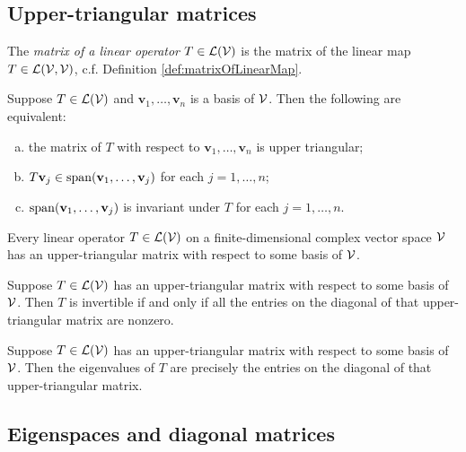 \subsection{Upper-triangular matrices}

\begin{defn}
  The \emph{matrix of a linear operator} $T\in {\cal L}({\cal V})$
  is the matrix of the linear map $T\in {\cal L}({\cal V}, {\cal V})$,
  c.f. Definition \ref{def:matrixOfLinearMap}.
\end{defn}

\begin{thm}
  \label{thm:upperTriangAndInvariantSubspaces}
  Suppose $T\in {\cal L}({\cal V})$
  and $\mathbf{v}_1, \ldots, \mathbf{v}_n$
  is a basis of ${\cal V}$.
  Then the following are equivalent:
  \begin{enumerate}[(a)]\itemsep0em
  \item the matrix of $T$ with respect to
    $\mathbf{v}_1, \ldots, \mathbf{v}_n$
    is upper triangular;
  \item $T\mathbf{v}_j\in \mathrm{span}(\mathbf{v}_1, \ldots, \mathbf{v}_j)$
    for each $j=1, \ldots, n$;
  \item $\mathrm{span}(\mathbf{v}_1, \ldots, \mathbf{v}_j)$
    is invariant under $T$
    for each $j=1, \ldots, n$.
  \end{enumerate}
\end{thm}

\begin{thm}
  \label{thm:linearOpHasTriangularMatrix}
  Every linear operator $T\in {\cal L}({\cal V})$
  on a finite-dimensional complex vector space ${\cal V}$ 
  has an upper-triangular matrix
  with respect to some basis of ${\cal V}$.
\end{thm}

\begin{thm}
  Suppose $T\in {\cal L}({\cal V})$ has an upper-triangular matrix
  with respect to some basis of ${\cal V}$.
  Then $T$ is invertible if and only if
  all the entries on the diagonal of
  that upper-triangular matrix are nonzero.
\end{thm}

\begin{thm}
  Suppose $T\in {\cal L}({\cal V})$ has an upper-triangular matrix
  with respect to some basis of ${\cal V}$.
  Then the eigenvalues of $T$ are precisely the entries
  on the diagonal of that upper-triangular matrix.
\end{thm}

\subsection{Eigenspaces and diagonal matrices}
\label{sec:eigensp-diag-matr}

